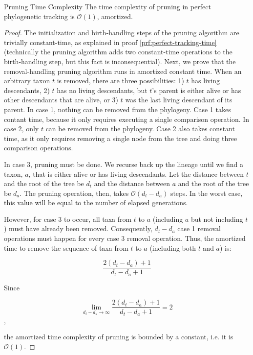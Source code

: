 \begin{theorem}{Pruning Time Complexity}
\label{thm:perfect-tracking-with-pruning-time}
The time complexity of pruning in perfect phylogenetic tracking is $\mathcal{O}(1)$, amortized. 
\end{theorem}

\begin{proof}
\label{prf:perfect-tracking-with-pruning-time}
The initialization and birth-handling steps of the pruning algorithm are trivially constant-time, as explained in proof \ref{prf:perfect-tracking-time} (technically the pruning algorithm adds two constant-time operations to the birth-handling step, but this fact is inconsequential).
Next, we prove that the removal-handling pruning algorithm runs in amortized constant time.
When an arbitrary taxon $t$ is removed, there are three possibilities: 1) $t$ has living descendants, 2) $t$ has no living descendants, but $t$'s parent is either alive or has other descendants that are alive, or 3) $t$ was the last living descendant of its parent.
In case 1, nothing can be removed from the phylogeny.
Case 1 takes contant time, because it only requires executing a single comparison operation.
In case 2, only $t$ can be removed from the phylogeny.
Case 2 also takes constant time, as it only requires removing a single node from the tree and doing three comparison operations.

In case 3, pruning must be done.
We recurse back up the lineage until we find a taxon, $a$, that is either alive or has living descendants. 
Let the distance between $t$ and the root of the tree be $d_t$ and the distance between $a$ and the root of the tree be $d_a$.
The pruning operation, then, takes $\mathcal{O}(d_t - d_a)$ steps. 
In the worst case, this value will be equal to the number of elapsed generations.

However, for case 3 to occur, all taxa from $t$ to $a$ (including $a$ but not including $t$) must have already been removed.
Consequently, $d_t - d_a$ case 1 removal operations must happen for every case 3 removal operation.
Thus, the amortized time to remove the sequence of taxa from $t$ to $a$ (including both $t$ and $a$) is:

\[
\frac{2(d_t - d_a) + 1}{d_t - d_a + 1}
\]

Since

\[
\lim_{d_t - d_a\to\infty} \frac{2(d_t - d_a) + 1}{d_t - d_a + 1} = 2
\],

the amortized time complexity of pruning is bounded by a constant, i.e. it is $\mathcal{O}(1)$.


\end{proof}



